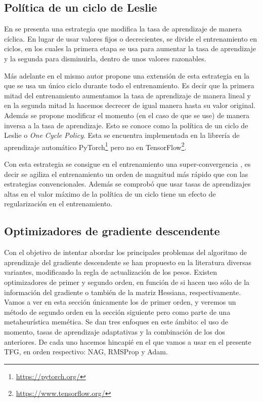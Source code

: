 \subsection{Política de un ciclo de Leslie} \label{sec:leslie}

En \cite{leslie1} se presenta una estrategia que modifica la tasa de aprendizaje de manera cíclica. En lugar de usar valores fijos o decrecientes, se divide el entrenamiento en ciclos, en los cuales la primera etapa se usa para aumentar la tasa de aprendizaje y la segunda para disminuirla, dentro de unos valores razonables. 

Más adelante en \cite{leslie2} el mismo autor propone una extensión de esta estrategia en la que se usa un único ciclo durante todo el entrenamiento. Es decir que la primera mitad del entrenamiento aumentamos la tasa de aprendizaje de manera lineal y en la segunda mitad la hacemos decrecer de igual manera hasta su valor original. Además se propone modificar el momento (en el caso de que se use) de manera inversa a la tasa de aprendizaje. Esto se conoce como la política de un ciclo de Leslie o \textit{One Cycle Policy}. Esta se encuentra implementada en la librería de aprendizaje automático PyTorch\footnote{\url{https://pytorch.org/}} pero no en TensorFlow\footnote{\url{https://www.tensorflow.org/}}.

Con esta estrategia se consigue en el entrenamiento una super-convergencia \cite{leslie3}, es decir se agiliza el entrenamiento un orden de magnitud más rápido que con las estrategias convencionales. Además se comprobó que usar tasas de aprendizajes altas en el valor máximo de la política de un ciclo tiene un efecto de regularización en el entrenamiento.

\subsection{Optimizadores de gradiente descendente}
\label{sec:gd}
Con el objetivo de intentar abordar los principales problemas del algoritmo de aprendizaje del gradiente descendente se han propuesto en la literatura diversas variantes, modificando la regla de actualización de los pesos. Existen optimizadores de primer y segundo orden, en función de si hacen uso sólo de la información del gradiente o también de la matriz Hessiana, respectivamente. Vamos a ver en esta sección únicamente los de primer orden, y veremos un método de segundo orden en la sección siguiente pero como parte de una metaheurística memética. Se dan tres enfoques en este ámbito: el uso de momento, tasas de aprendizaje adaptativas y la combinación de los dos anteriores. De cada uno hacemos hincapié en el que vamos a usar en el presente TFG, en orden respectivo: NAG, RMSProp y Adam.

